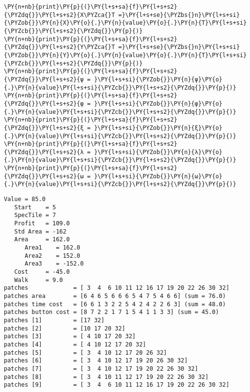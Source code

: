 \begin{tcolorbox}[breakable, size=fbox, boxrule=1pt, pad at break*=1mm,colback=cellbackground, colframe=cellborder]
    \begin{Verbatim}[commandchars=\\\{\}]
\PY{n+nb}{print}\PY{p}{(}\PY{l+s+sa}{f}\PY{l+s+s2}{\PYZdq{}}\PY{l+s+s2}{X\PYZca{}T =}\PY{l+s+se}{\PYZbs{}n}\PY{l+s+si}{\PYZob{}}\PY{n}{X}\PY{o}{.}\PY{n}{value}\PY{o}{.}\PY{n}{T}\PY{l+s+si}{\PYZcb{}}\PY{l+s+s2}{\PYZdq{}}\PY{p}{)}
\PY{n+nb}{print}\PY{p}{(}\PY{l+s+sa}{f}\PY{l+s+s2}{\PYZdq{}}\PY{l+s+s2}{Y\PYZca{}T =}\PY{l+s+se}{\PYZbs{}n}\PY{l+s+si}{\PYZob{}}\PY{n}{Y}\PY{o}{.}\PY{n}{value}\PY{o}{.}\PY{n}{T}\PY{l+s+si}{\PYZcb{}}\PY{l+s+s2}{\PYZdq{}}\PY{p}{)}
\PY{n+nb}{print}\PY{p}{(}\PY{l+s+sa}{f}\PY{l+s+s2}{\PYZdq{}}\PY{l+s+s2}{ψ = }\PY{l+s+si}{\PYZob{}}\PY{n}{ψ}\PY{o}{.}\PY{n}{value}\PY{l+s+si}{\PYZcb{}}\PY{l+s+s2}{\PYZdq{}}\PY{p}{)}
\PY{n+nb}{print}\PY{p}{(}\PY{l+s+sa}{f}\PY{l+s+s2}{\PYZdq{}}\PY{l+s+s2}{φ = }\PY{l+s+si}{\PYZob{}}\PY{n}{φ}\PY{o}{.}\PY{n}{value}\PY{l+s+si}{\PYZcb{}}\PY{l+s+s2}{\PYZdq{}}\PY{p}{)}
\PY{n+nb}{print}\PY{p}{(}\PY{l+s+sa}{f}\PY{l+s+s2}{\PYZdq{}}\PY{l+s+s2}{ξ = }\PY{l+s+si}{\PYZob{}}\PY{n}{ξ}\PY{o}{.}\PY{n}{value}\PY{l+s+si}{\PYZcb{}}\PY{l+s+s2}{\PYZdq{}}\PY{p}{)}
\PY{n+nb}{print}\PY{p}{(}\PY{l+s+sa}{f}\PY{l+s+s2}{\PYZdq{}}\PY{l+s+s2}{λ = }\PY{l+s+si}{\PYZob{}}\PY{n}{λ}\PY{o}{.}\PY{n}{value}\PY{l+s+si}{\PYZcb{}}\PY{l+s+s2}{\PYZdq{}}\PY{p}{)}
\PY{n+nb}{print}\PY{p}{(}\PY{l+s+sa}{f}\PY{l+s+s2}{\PYZdq{}}\PY{l+s+s2}{ω = }\PY{l+s+si}{\PYZob{}}\PY{n}{ω}\PY{o}{.}\PY{n}{value}\PY{l+s+si}{\PYZcb{}}\PY{l+s+s2}{\PYZdq{}}\PY{p}{)}
    \end{Verbatim}
\end{tcolorbox}

\vspace*{-0.25cm}


\fontsize{8.75}{10.5}\selectfont %

\begin{Verbatim}[commandchars=\\\{\}]
Value = 85.0
   Start    = 5
   SpecTile = 7
   Profit   = 109.0
   Std Area = -162
   Area     = 162.0
      Area1    = 162.0
      Area2    = 152.0
      Area3    = -152.0
   Cost     = -45.0
   Walk     = 9.0
patches             = [ 3  4  6 10 11 12 16 17 19 20 22 26 30 32]
patches area        = [6 4 6 5 6 6 6 5 4 7 5 4 6 6] (sum = 76.0)
patches time cost   = [6 6 1 3 2 2 5 4 2 4 2 2 6 3] (sum = 48.0)
patches button cost = [8 7 2 2 1 7 1 5 4 1 1 3 3] (sum = 45.0)
patches [1]         = [17 32]
patches [2]         = [10 17 20 32]
patches [3]         = [ 4 10 17 20 32]
patches [4]         = [ 4 10 12 17 20 32]
patches [5]         = [ 3  4 10 12 17 20 26 32]
patches [6]         = [ 3  4 10 12 17 19 20 26 30 32]
patches [7]         = [ 3  4 10 12 17 19 20 22 26 30 32]
patches [8]         = [ 3  4 10 11 12 17 19 20 22 26 30 32]
patches [9]         = [ 3  4  6 10 11 12 16 17 19 20 22 26 30 32]
\end{Verbatim}

